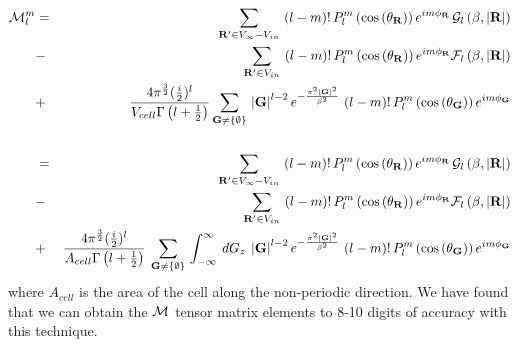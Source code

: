 \commentoutA{\documentclass[prb,aps,twocolumn,showpacs,twocolumngrid,superbib]{revtex4}}
\begin{document}
\begin{eqnarray*}
{\cal M}^{m}_{l} & = & \sum _{{\mathbf{R}'}\in V_{\infty }-V_{in}}\, \left( l-m\right) !\, P_{l}^{m}\left( \cos \left( \theta _{\mathbf{R}}\right) \right) e^{im\phi _{\mathbf{R}}}\, {\cal G}_{l}\left( \beta ,\left| \mathbf{R}\right| \right) \\
 & - & \sum _{{\mathbf{R}'}\in V_{in}}\, \left( l-m\right) !\, P_{l}^{m}\left( \cos \left( \theta _{\mathbf{R}}\right) \right) e^{im\phi _{\mathbf{R}}}{\cal F}_{l}\left( \beta ,\left| \mathbf{R}\right| \right) \\
 & + & \frac{4\pi ^{\frac{3}{2}}(\frac{i}{2})^{l}}{V_{cell}\Gamma \left( l+\frac{1}{2}\right) }\sum _{\mathbf{G}\neq \left\{ \emptyset \right\} }\, \left| \mathbf{G}\right| ^{l-2}e^{-\frac{\pi ^{2}\left| \mathbf{G}\right| ^{2}}{\beta ^{2}}}\, \left( l-m\right) !\, P_{l}^{m}\left( \cos \left( \theta _{\mathbf{G}}\right) \right) e^{im\phi _{\mathbf{G}}}\\
 &  & \\
 & = & \sum _{{\mathbf{R}'}\in V_{\infty }-V_{in}}\, \left( l-m\right) !\, P_{l}^{m}\left( \cos \left( \theta _{\mathbf{R}}\right) \right) e^{im\phi _{\mathbf{R}}}\, {\cal G}_{l}\left( \beta ,\left| \mathbf{R}\right| \right) \\
 & - & \sum _{{\mathbf{R}'}\in V_{in}}\, \left( l-m\right) !\, P_{l}^{m}\left( \cos \left( \theta _{\mathbf{R}}\right) \right) e^{im\phi _{\mathbf{R}}}{\cal F}_{l}\left( \beta ,\left| \mathbf{R}\right| \right) \\
 & + & \frac{4\pi ^{\frac{3}{2}}(\frac{i}{2})^{l}}{A_{cell}\Gamma \left( l+\frac{1}{2}\right) }\: \sum _{\mathbf{G}\neq \left\{ \emptyset \right\} }\, \int _{-\infty }^{\infty }\: dG_{z}\: \left| \mathbf{G}\right| ^{l-2}e^{-\frac{\pi ^{2}\left| \mathbf{G}\right| ^{2}}{\beta ^{2}}}\, \left( l-m\right) !\, P_{l}^{m}\left( \cos \left( \theta _{\mathbf{G}}\right) \right) e^{im\phi _{\mathbf{G}}}
\end{eqnarray*}
\begin{equation}
\label{C10}
\, 
\end{equation}
where \( A_{cell} \) is the area of the cell along the non-periodic
direction. We have found that we can obtain the \( {\cal M} \) tensor
matrix elements to 8-10 digits of accuracy with this technique.


\section*{}
\end{document}
